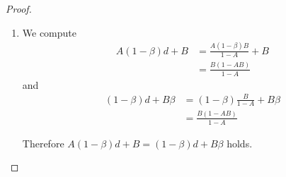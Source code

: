 \documentclass[reqno]{amsart}
\theoremstyle{remark}
\theoremstyle{Definition}
\theoremstyle{remark}
\numberwithin{equation}{section}
\begin{document}
\begin{proof}
\begin{enumerate}
    \item  We compute
        \begin{align*}
        A(1-\beta)d+B &= \frac{A(1-\beta)B}{1-A}+B\\
        &= \frac{B(1-AB)}{1-A}
    \end{align*}
    and 
       \begin{align*}
        (1-\beta)d+B\beta &= (1-\beta)\frac{B}{1-A}+ B\beta\\
        &= \frac{B(1-AB)}{1-A}
    \end{align*} 
    
Therefore $ A(1-\beta)d+B= (1-\beta)d+B\beta$ holds.
\end{enumerate}
\end{proof}
\end{document}
